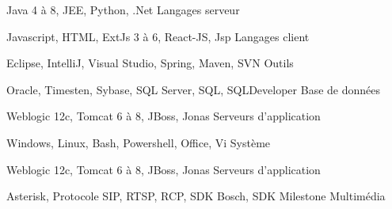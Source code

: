 



\begin{cvhonors}

  \cvhonor
    {} %
    {Java 4 à 8, JEE, Python, .Net} %
    {} %
    {Langages serveur} %

  \cvhonor
    {} %
    {Javascript, HTML, ExtJs 3 à 6, React-JS, Jsp} %
    {} %
    {Langages client} %

  \cvhonor
    {} %
    {Eclipse, IntelliJ, Visual Studio, Spring, Maven, SVN} %
    {} %
    {Outils} %
    
  \cvhonor
    {} %
    {Oracle, Timesten, Sybase, SQL Server, SQL, SQLDeveloper} %
    {} %
    {Base de données} %

  \cvhonor
    {} %
    {Weblogic 12c, Tomcat 6 à 8, JBoss, Jonas} %
    {} %
    {Serveurs d'application} %

  \cvhonor
    {} %
    {Windows, Linux, Bash, Powershell, Office, Vi} %
    {} %
    {Système} %

  \cvhonor
    {} %
    {Weblogic 12c, Tomcat 6 à 8, JBoss, Jonas} %
    {} %
    {Serveurs d'application} %

  \cvhonor
    {} %
    {Asterisk, Protocole SIP, RTSP, RCP, SDK Bosch, SDK Milestone} %
    {} %
    {Multimédia} %
    
\end{cvhonors}


